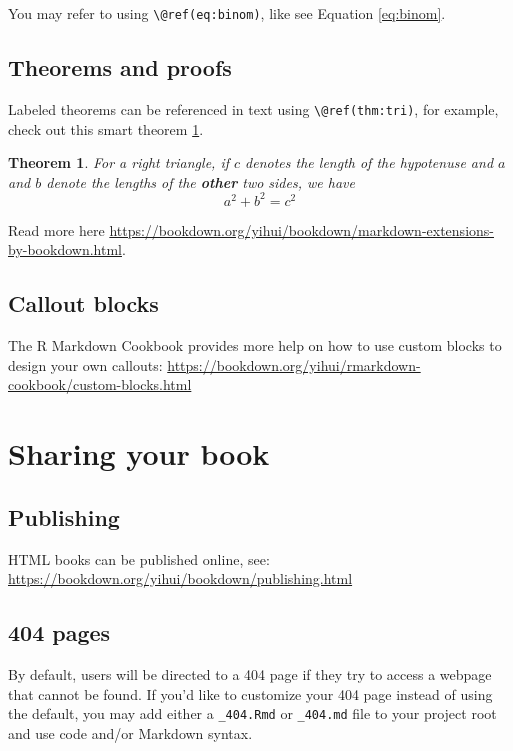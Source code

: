 \documentclass[
]{book}
\newtheorem{theorem}{Theorem}[chapter]
\theoremstyle{definition}
\theoremstyle{definition}
\theoremstyle{definition}
\theoremstyle{definition}
\theoremstyle{remark}
\begin{document}
You may refer to using \texttt{\textbackslash{}@ref(eq:binom)}, like see Equation \eqref{eq:binom}.

\hypertarget{theorems-and-proofs}{%
\section{Theorems and proofs}\label{theorems-and-proofs}}

Labeled theorems can be referenced in text using \texttt{\textbackslash{}@ref(thm:tri)}, for example, check out this smart theorem \ref{thm:tri}.

\begin{theorem}
\protect\hypertarget{thm:tri}{}\label{thm:tri}For a right triangle, if \(c\) denotes the \emph{length} of the hypotenuse
and \(a\) and \(b\) denote the lengths of the \textbf{other} two sides, we have
\[a^2 + b^2 = c^2\]
\end{theorem}

Read more here \url{https://bookdown.org/yihui/bookdown/markdown-extensions-by-bookdown.html}.

\hypertarget{callout-blocks}{%
\section{Callout blocks}\label{callout-blocks}}

The R Markdown Cookbook provides more help on how to use custom blocks to design your own callouts: \url{https://bookdown.org/yihui/rmarkdown-cookbook/custom-blocks.html}

\hypertarget{sharing-your-book}{%
\chapter{Sharing your book}\label{sharing-your-book}}

\hypertarget{publishing}{%
\section{Publishing}\label{publishing}}

HTML books can be published online, see: \url{https://bookdown.org/yihui/bookdown/publishing.html}

\hypertarget{pages}{%
\section{404 pages}\label{pages}}

By default, users will be directed to a 404 page if they try to access a webpage that cannot be found. If you'd like to customize your 404 page instead of using the default, you may add either a \texttt{\_404.Rmd} or \texttt{\_404.md} file to your project root and use code and/or Markdown syntax.
\end{document}
